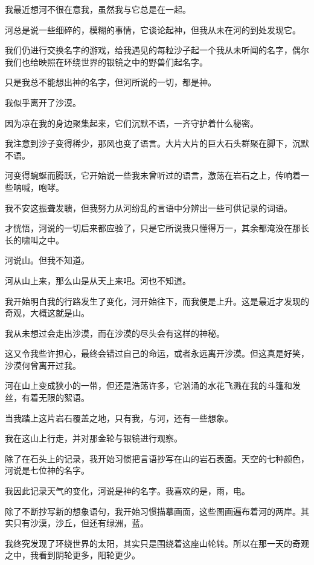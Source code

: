 \documentclass[UTF8]{article}
\begin{document}
\par 我最近想河不很在意我，虽然我与它总是在一起。
\par 河总是说一些细碎的，模糊的事情，它谈论起神，但我从未在河的到处发现它。
\par 我们仍进行交换名字的游戏，给我遇见的每粒沙子起一个我从未听闻的名字，偶尔我们也给映照在环绕世界的银镜之中的野兽们起名字。
\par 只是我总不能想出神的名字，但河所说的一切，都是神。
\\[0.6cm]
\par 我似乎离开了沙漠。
\par 因为凉在我的身边聚集起来，它们沉默不语，一齐守护着什么秘密。
\par 我注意到沙子变得稀少，那风也变了语言。大片大片的巨大石头群聚在脚下，沉默不语。
\par 河变得蜿蜒而腾跃，它开始说一些我未曾听过的语言，激荡在岩石之上，传响着一些呐喊，咆哮。
\par 我不安这振聋发聩，但我努力从河纷乱的言语中分辨出一些可供记录的词语。
\par 才恍悟，河说的一切后来都应验了，只是它所说我只懂得万一，其余都淹没在那长长的啸叫之中。
\\[0.6cm]
\par 河说山。但我不知道。
\par 河从山上来，那么山是从天上来吧。河也不知道。
\par 我开始明白我的行路发生了变化，河开始往下，而我便是上升。这是最近才发现的奇观，大概这就是山。
\par 我从未想过会走出沙漠，而在沙漠的尽头会有这样的神秘。
\par 这又令我些许担心，最终会错过自己的命运，或者永远离开沙漠。但这真是好笑，沙漠何曾离开过我。
\par 河在山上变成狭小的一带，但还是浩荡许多，它汹涌的水花飞溅在我的斗篷和发丝，有着无限的絮语。
\par 当我踏上这片岩石覆盖之地，只有我，与河，还有一些想象。
\\[0.6cm]
\par 我在这山上行走，并对那金轮与银镜进行观察。
\par 除了在石头上的记录，我开始习惯把言语抄写在山的岩石表面。天空的七种颜色，河说是七位神的名字。
\par 我因此记录天气的变化，河说是神的名字。我喜欢的是，雨，电。
\par 除了不断抄写新的想象语句，我开始习惯描摹画面，这些图画遍布着河的两岸。其实只有沙漠，沙丘，但还有绿洲，蓝。
\par 我终究发现了环绕世界的太阳，其实只是围绕着这座山轮转。所以在那一天的奇观之中，我看到阴轮更多，阳轮更少。
\end{document}
